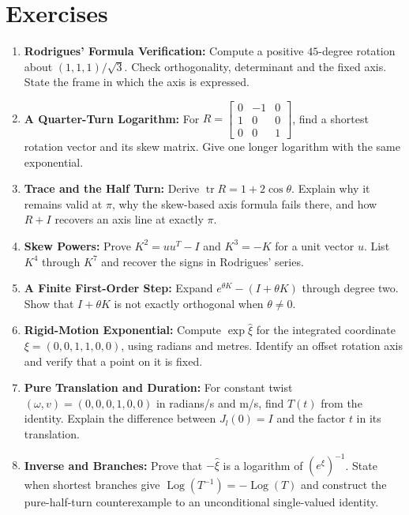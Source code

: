 \section{Exercises}
\label{sec:exercises_ch6}

\begin{enumerate}[itemsep=3pt,topsep=4pt]
\item \textbf{Rodrigues' Formula Verification:} Compute a positive $45$-degree rotation about $(1,1,1)/\sqrt3$. Check orthogonality, determinant and the fixed axis. State the frame in which the axis is expressed.

\item \textbf{A Quarter-Turn Logarithm:} For $R=\begin{bmatrix}0&-1&0\\1&0&0\\0&0&1\end{bmatrix}$, find a shortest rotation vector and its skew matrix. Give one longer logarithm with the same exponential.

\item \textbf{Trace and the Half Turn:} Derive $\operatorname{tr}R=1+2\cos\theta$. Explain why it remains valid at $\pi$, why the skew-based axis formula fails there, and how $R+I$ recovers an axis line at exactly $\pi$.

\item \textbf{Skew Powers:} Prove $K^2=uu^T-I$ and $K^3=-K$ for a unit vector $u$. List $K^4$ through $K^7$ and recover the signs in Rodrigues' series.

\item \textbf{A Finite First-Order Step:} Expand $e^{\theta K}-(I+\theta K)$ through degree two. Show that $I+\theta K$ is not exactly orthogonal when $\theta\ne0$.

\item \textbf{Rigid-Motion Exponential:} Compute $\exp\widehat\xi$ for the integrated coordinate $\xi=(0,0,1,1,0,0)$, using radians and metres. Identify an offset rotation axis and verify that a point on it is fixed.

\item \textbf{Pure Translation and Duration:} For constant twist $(\omega,v)=(0,0,0,1,0,0)$ in radians/s and m/s, find $T(t)$ from the identity. Explain the difference between $J_l(0)=I$ and the factor $t$ in its translation.

\item \textbf{Inverse and Branches:} Prove that $-\widehat\xi$ is a logarithm of $(e^{\widehat\xi})^{-1}$. State when shortest branches give $\operatorname{Log}(T^{-1})=-\operatorname{Log}(T)$ and construct the pure-half-turn counterexample to an unconditional single-valued identity.


\end{enumerate}
